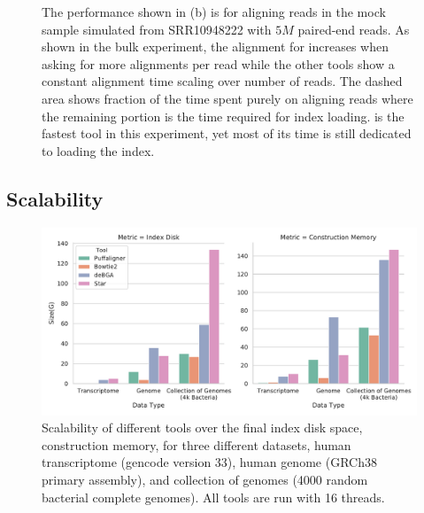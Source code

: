 \begin{figure}
{    The performance shown in (b) is for aligning reads
    in the mock sample simulated from SRR10948222 with $5M$ paired-end reads.
    As shown in the bulk experiment, the alignment for \bt
    increases when asking for more alignments per read while the other tools show a
    constant alignment time scaling over number of reads. The dashed area
    shows fraction of the time spent purely on aligning reads where the
    remaining portion is the time required for index loading. \puffaligner is 
    the fastest tool in this experiment, yet most of its time is still dedicated
    to loading the index.}
    \label{fig:alignment_performance}
    \vspace{-0.2in}
\end{figure}



\subsection{Scalability}
\begin{figure}%
    \centering
    \includegraphics[width=0.8\columnwidth,type=pdf,ext=.pdf,read=.pdf]
    {Figures/puff/indexSizeScale}
    \caption[scalability of different aligners - memory]
    {Scalability of different tools over the final index disk space, construction 
    memory, for three different datasets, human transcriptome (gencode version 33), 
    human genome (GRCh38 primary assembly), and collection of genomes (4000
    random bacterial complete genomes). All tools are run with 16 threads.}
    \label{sfig:size}
\end{figure}
